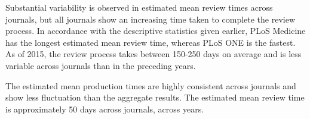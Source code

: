 Substantial variability is observed in estimated mean review times across journals, but all journals show an increasing time taken to complete the review process. In accordance with the descriptive statistics given earlier, PLoS Medicine has the longest estimated mean review time, whereas PLoS ONE is the fastest. As of 2015, the review process takes between 150-250 days on average and is less variable across journals than in the preceding years.

The estimated mean production times are highly consistent across journals and show less fluctuation than the aggregate results. The estimated mean review time is approximately 50 days across journals, across years.